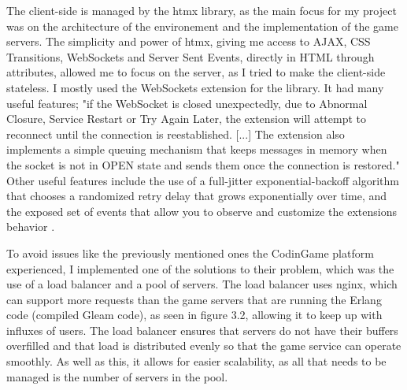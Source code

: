 \documentclass[]{final}
\begin{document}
The client-side is managed by the htmx library, as the main focus for my project
was on the architecture of the environement and the implementation of the game
servers. The simplicity and power of htmx, giving me access to AJAX, CSS Transitions,
WebSockets and Server Sent Events, directly in HTML through attributes,\cite{noauthor_htmx_nodate} allowed me to
focus on the server, as I tried to make the client-side stateless. I mostly
used the WebSockets extension for the library. It had many useful features;
"if the WebSocket is closed unexpectedly, due to Abnormal Closure, Service Restart
or Try Again Later, the extension will attempt to reconnect until the connection
is reestablished. [...] The extension also implements a simple queuing mechanism that
keeps messages in memory when the socket is not in OPEN state and sends
them once the connection is restored."\cite{noauthor_htmx_ws_nodate} Other useful features include the
use of a full-jitter exponential-backoff algorithm that chooses a randomized
retry delay that grows exponentially over time, and the exposed
set of events that allow you to observe and customize the extensions behavior
\cite{noauthor_htmx_ws_nodate}.


To avoid issues like the previously mentioned ones the CodinGame platform
experienced, I implemented one of the
solutions to their problem, which was the use of a load balancer and a pool
of servers\cite{jobert_story_2017}. The load balancer uses nginx, which can
support more requests
than the game servers that are running the Erlang code (compiled Gleam code),
as seen in figure 3.2, allowing it to keep up with influxes of users.
The load balancer ensures that servers do not have their buffers overfilled
and that load is distributed evenly so that the game service can operate smoothly.
As well as this, it allows for easier scalability, as all that needs to be managed is the
number of servers in the pool.

\end{document}
